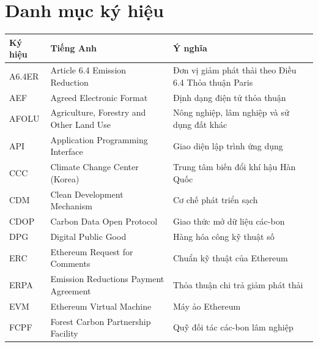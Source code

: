 \documentclass[a4paper,oneside]{report}
\numberwithin{equation}{chapter}
\begin{document}
\chapter*{Danh mục ký hiệu}
{}
\begin{longtable}{@{}p{2.4cm}p{5.4cm}p{6.3cm}@{}}
\toprule
\textbf{Ký hiệu} & \textbf{Tiếng Anh} & \textbf{Ý nghĩa} \\
\midrule
\endhead
\bottomrule
\endfoot
A6.4ER & Article 6.4 Emission Reduction           & Đơn vị giảm phát thải theo Điều 6.4 Thỏa thuận Paris \\
AEF    & Agreed Electronic Format                  & Định dạng điện tử thỏa thuận \\
AFOLU  & Agriculture, Forestry and Other Land Use  & Nông nghiệp, lâm nghiệp và sử dụng đất khác \\
API    & Application Programming Interface         & Giao diện lập trình ứng dụng \\
CCC    & Climate Change Center (Korea)             & Trung tâm biến đổi khí hậu Hàn Quốc \\
CDM    & Clean Development Mechanism               & Cơ chế phát triển sạch \\
CDOP   & Carbon Data Open Protocol                 & Giao thức mở dữ liệu các-bon \\
DPG    & Digital Public Good                       & Hàng hóa công kỹ thuật số \\
ERC    & Ethereum Request for Comments             & Chuẩn kỹ thuật của Ethereum \\
ERPA   & Emission Reductions Payment Agreement     & Thỏa thuận chi trả giảm phát thải \\
EVM    & Ethereum Virtual Machine                  & Máy ảo Ethereum \\
FCPF   & Forest Carbon Partnership Facility        & Quỹ đối tác các-bon lâm nghiệp \\

\end{longtable}
\end{document}
